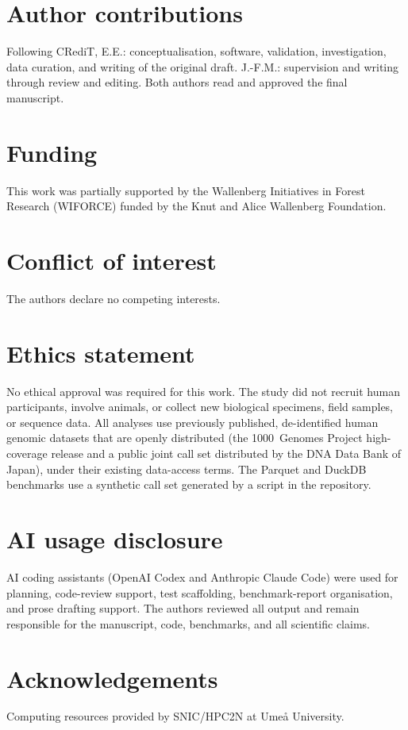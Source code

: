 \documentclass[11pt]{article}
\begin{document}





\section*{Author contributions}
Following CRediT, E.E.: conceptualisation, software, validation, investigation,
data curation, and writing of the original draft. J.-F.M.: supervision and
writing through review and editing. Both authors read and approved the final
manuscript.

\section*{Funding}
This work was partially supported by the Wallenberg Initiatives in Forest
Research (WIFORCE) funded by the Knut and Alice Wallenberg Foundation.

\section*{Conflict of interest}
The authors declare no competing interests.

\section*{Ethics statement}
No ethical approval was required for this work. The study did not recruit human
participants, involve animals, or collect new biological specimens, field
samples, or sequence data. All analyses use previously published,
de-identified human genomic datasets that are openly distributed (the
1000~Genomes Project high-coverage release and a public joint call set
distributed by the DNA Data Bank of Japan), under their existing data-access
terms. The Parquet and DuckDB benchmarks use a synthetic call set generated by
a script in the repository.

\section*{AI usage disclosure}
AI coding assistants (OpenAI Codex and Anthropic Claude Code) were used for
planning, code-review support, test scaffolding, benchmark-report organisation,
and prose drafting support. The authors reviewed all output and remain
responsible for the manuscript, code, benchmarks, and all scientific claims.

\section*{Acknowledgements}
Computing resources provided by SNIC/HPC2N at Ume{\aa} University.
\end{document}
